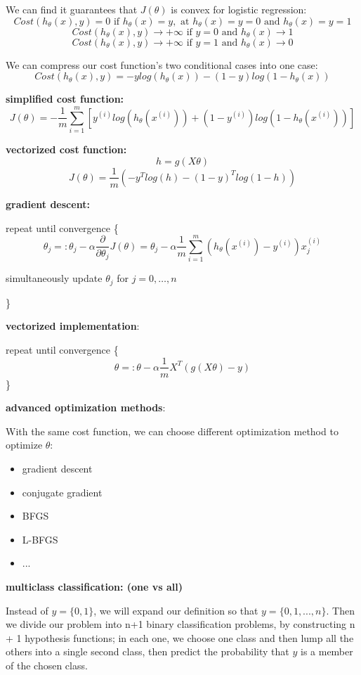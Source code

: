 \documentclass{article}
\begin{document}
We can find it guarantees that \(J(\theta)\) is convex for logistic regression:
\[
Cost(h_{\theta}(x), y) = 0 \text{ if }
h_{\theta}(x) = y, \text{ at } h_{\theta}(x) = y = 0 \text{ and } 
h_{\theta}(x) = y = 1
\]
\[
Cost(h_{\theta}(x), y) \rightarrow +\infty
\text{ if } y = 0 \text{ and }
h_{\theta}(x) \rightarrow 1
\]
\[
Cost(h_{\theta}(x), y) \rightarrow +\infty
\text{ if } y = 1 \text{ and }
h_{\theta}(x) \rightarrow 0
\]

We can compress our cost function's two conditional cases into one case:
\[Cost(h_{\theta} (x), y) 
= - y log(h_{\theta} (x)) - (1 - y) log(1 - h_{\theta} (x))\]

\textbf{simplified cost function:}
\[J(\theta) = - \frac{1}{m} \sum_{i = 1}^{m} [y^{(i)} log(h_{\theta} (x^{(i)})) + (1 - y^{(i)}) log(1 - h_{\theta} (x^{(i)}))]\]

\textbf{vectorized cost function:}
\[h = g(X\theta)\]
\[J(\theta) = \frac{1}{m} (- y^T log(h) - (1 - y)^T log(1 - h))\]

\textbf{gradient descent:}

repeat until convergence \{
\[\theta_j =: \theta_j - \alpha \frac{\partial}{\partial \theta_j} J(\theta) = \theta_j - \alpha \frac{1}{m} \sum_{i = 1}^m (h_{\theta}(x^{(i)}) - y^{(i)}) x^{(i)}_j\]
\centerline{simultaneously update \(\theta_j\) for \(j = 0, \dots, n\)}
\}

\textbf{vectorized implementation}:

repeat until convergence \{
\[\theta =: \theta - \alpha \frac{1}{m} X^T (g(X\theta) - y)\]
\}

\textbf{advanced optimization methods}:

With the same cost function, we can choose different optimization method to optimize \(\theta\):

\begin{itemize}
\item gradient descent
\item conjugate gradient
\item BFGS
\item L-BFGS
\item ...
\end{itemize}

\textbf{multiclass classification: (one vs all)}

Instead of \(y = \{0, 1\}\), we will expand our definition so that \(y = \{0, 1, ..., n\}\). Then we divide our problem into n+1 binary classification problems, by constructing n + 1 hypothesis functions; in each one, we choose one class and then lump all the others into a single second class, then predict the probability that \(y\) is a member of the chosen class.
\end{document}
